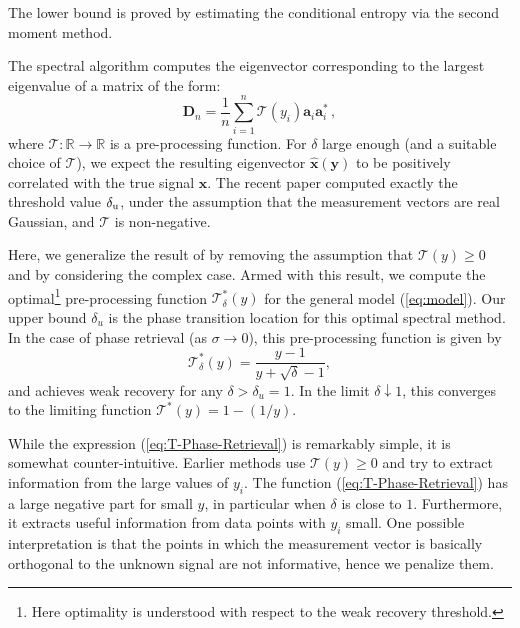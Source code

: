 \documentclass[final,12pt]{colt2018}
\def\ba{{\boldsymbol a}}
\def\bx{{\boldsymbol x}}
\def\by{{\boldsymbol y}}
\def\bD{{\boldsymbol D}}
\def\cT{{\mathcal T}}
\begin{document}
The lower bound is proved by estimating the conditional entropy via the second moment method.

The spectral algorithm computes the eigenvector  corresponding to the largest eigenvalue of a matrix of the form:
%
\begin{equation}
\bD_n = \frac{1}{n}\sum_{i=1}^n \mathcal T (y_i) \ba_i \ba_i^*\, ,\label{eq:D_Matrix}
\end{equation}
%
where $\mathcal T: \mathbb R\to \mathbb R$ is a pre-processing function. 
For $\delta$ large  enough (and a suitable choice of $\mathcal T$), we expect the resulting eigenvector $\hat{\bx}(\by)$ to be positively 
correlated with the true signal $\bx$. 
The recent paper \citep{lulispectral_arxiv}  computed exactly the threshold value $\delta_{\rm u}$, 
under the assumption that the measurement vectors are real Gaussian, and $\cT$ is non-negative.




Here, we generalize the result of \citep{lulispectral_arxiv} by removing the assumption that  $\mathcal T(y)\ge 0$ and by considering the complex case. 
Armed with this result, we compute the optimal\footnote{Here optimality is understood with respect to  the weak recovery threshold.} 
pre-processing function $\cT^*_{\delta}(y)$ for the general model (\ref{eq:model}). Our upper bound
$\delta_u$ is the phase transition location for this optimal spectral method.  
In the  case of phase retrieval (as $\sigma\to 0$),  this pre-processing function is given by
%
\begin{equation}
\mathcal T^*_{\delta}(y) = \frac{y-1}{y+\sqrt{\delta}-1}, \label{eq:T-Phase-Retrieval}
\end{equation}
%
and achieves weak recovery for any $\delta>\delta_u=1$. 
In the limit $\delta\downarrow 1$, this converges to the limiting function $\cT^*(y) = 1-(1/y)$.

While the expression (\ref{eq:T-Phase-Retrieval}) is remarkably simple, it is somewhat counter-intuitive. Earlier methods 
\citep{candes2015wirt,chen2015solving,lulispectral_arxiv}  use $\cT(y)\ge 0$ and try to extract information from the large values of $y_i$. The function (\ref{eq:T-Phase-Retrieval})
has a large negative part for small $y$, in particular when $\delta$ is close to $1$. Furthermore, it extracts useful information from data
points with $y_i$ small. One possible interpretation is that the points in which the measurement vector is basically orthogonal to the unknown signal are not informative, hence we penalize them. 
\end{document}
